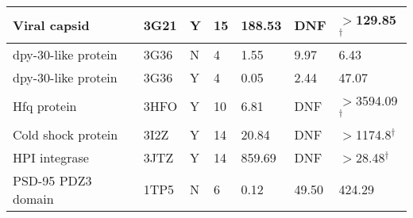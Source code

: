 \begin{table}
{\begin{tabular}{|p{1.9in}|p{0.5in}|p{0.3in}|p{0.6in}|p{0.75in}|p{0.75in}|p{0.75in}|}
Viral capsid 	&	3G21	&	Y	&	15	&	188.53	&	DNF	&	$>$129.85$^\dagger$	\\ \hline
dpy-30-like protein 	&	3G36	&	N	&	4	&	1.55	&	9.97	&	6.43	\\ \hline
dpy-30-like protein 	&	3G36	&	Y	&	4	&	0.05	&	2.44	&	47.07	\\ \hline
Hfq protein 	&	3HFO	&	Y	&	10	&	6.81	&	DNF	&	$>$3594.09$^\dagger$	\\ \hline
Cold shock protein 	&	3I2Z	&	Y	&	14	&	20.84	&	DNF	&	$>$1174.8$^\dagger$	\\ \hline
HPI integrase	&	3JTZ	&	Y	&	14	&	859.69	&	DNF	&	$>$28.48$^\dagger$	\\ \hline
PSD-95 PDZ3 domain	&	1TP5	&	N	&	6	&	0.12	&	49.50	&	424.29	\\ \hline
\end{tabular}
}
\end{table}




